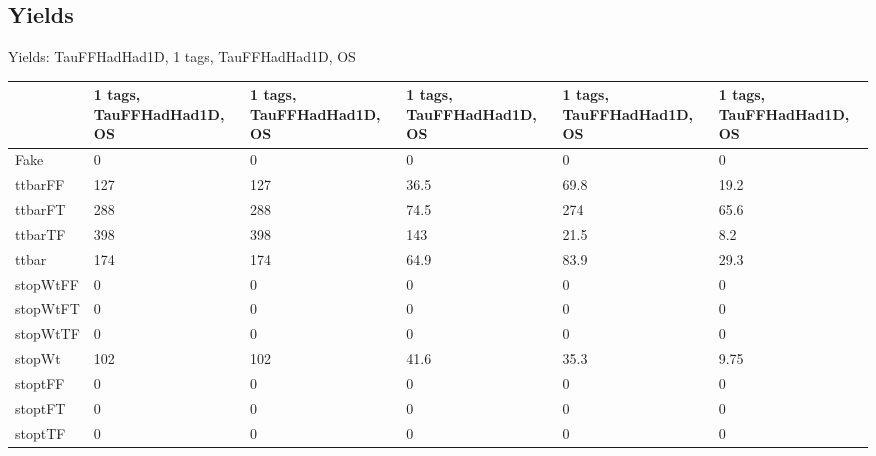 
\subsection{Yields}

\begin{frame}{Yields: TauFFHadHad1D, 1 tags, TauFFHadHad1D, OS}
\begin{center}
  \begin{tabular}{l| >{\centering\let\newline\\\arraybackslash\hspace{0pt}}m{1.4cm}| >{\centering\let\newline\\\arraybackslash\hspace{0pt}}m{1.4cm}| >{\centering\let\newline\\\arraybackslash\hspace{0pt}}m{1.4cm}| >{\centering\let\newline\\\arraybackslash\hspace{0pt}}m{1.4cm}| >{\centering\let\newline\\\arraybackslash\hspace{0pt}}m{1.4cm}}
    & 1 tags, TauFFHadHad1D, OS & 1 tags, TauFFHadHad1D, OS & 1 tags, TauFFHadHad1D, OS & 1 tags, TauFFHadHad1D, OS & 1 tags, TauFFHadHad1D, OS \\
 \hline \hline
    Fake& 0 & 0 & 0 & 0 & 0 \\
 \hline
    ttbarFF& 127 & 127 & 36.5 & 69.8 & 19.2 \\
 \hline
    ttbarFT& 288 & 288 & 74.5 & 274 & 65.6 \\
 \hline
    ttbarTF& 398 & 398 & 143 & 21.5 & 8.2 \\
 \hline
    ttbar& 174 & 174 & 64.9 & 83.9 & 29.3 \\
 \hline
    stopWtFF& 0 & 0 & 0 & 0 & 0 \\
 \hline
    stopWtFT& 0 & 0 & 0 & 0 & 0 \\
 \hline
    stopWtTF& 0 & 0 & 0 & 0 & 0 \\
 \hline
    stopWt& 102 & 102 & 41.6 & 35.3 & 9.75 \\
 \hline
    stoptFF& 0 & 0 & 0 & 0 & 0 \\
 \hline
    stoptFT& 0 & 0 & 0 & 0 & 0 \\
 \hline
    stoptTF& 0 & 0 & 0 & 0 & 0 \\
 \hline

\end{tabular}
\end{center}
\end{frame}
